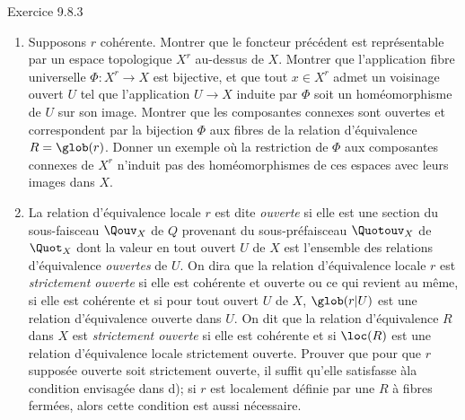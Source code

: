 \documentclass[10pt]{../fichiers-configuration-latex/smfart}
\begin{document}
\begin{enonce*}[remark]{Exercice 9.8.3}
\begin{enumerate}
\item Supposons $r$ cohérente. Montrer que le foncteur précédent est
représentable par un espace topologique $X^r$ au-dessus de $X$.
Montrer que l'application fibre universelle $\Phi:X^r\rightarrow X$
est bijective, et que tout $x\in X^r$ admet un voisinage ouvert $U$
tel que l'application $U\rightarrow X$ induite par $\Phi$ soit un
homéomorphisme de $U$ sur son image. Montrer que les composantes
connexes  sont ouvertes et correspondent par la bijection
$\Phi$ aux fibres de la relation d'équivalence $R=\glob(r)$. Donner
un exemple où la restriction de $\Phi$ aux composantes connexes de
$X^r$ n'induit pas des homéomorphismes de ces espaces avec leurs
images dans $X$.

\item La relation d'équivalence locale $r$ est dite \emph{ouverte} si
elle est une section du sous-faisceau $\Qouv_X$ de $Q$ provenant du
sous-préfaisceau $\Quotouv_X$ de $\Quot_X$ dont la valeur en tout
ouvert $U$ de $X$ est l'ensemble des relations d'équivalence
\emph{ouvertes} de $U$. On dira que la relation d'équivalence locale
$r$ est \emph{strictement ouverte} si elle est cohérente et ouverte
ou ce qui revient au même, si elle est cohérente et si pour tout
ouvert $U$ de $X$, $\glob(r| U)$ est une relation d'équivalence
ouverte dans $U$. On dit que la relation d'équivalence $R$ dans $X$
est \emph{strictement ouverte} si elle est cohérente et si $\loc(R)$
est une relation d'équivalence locale strictement ouverte. Prouver
que pour que $r$ supposée ouverte soit strictement ouverte, il
suffit qu'elle satisfasse à\pageoriginale la condition envisagée
dans d); si $r$ est localement définie par une $R$ à fibres fermées,
alors cette condition est aussi nécessaire.


\end{enumerate}
\end{enonce*}
\end{document}
